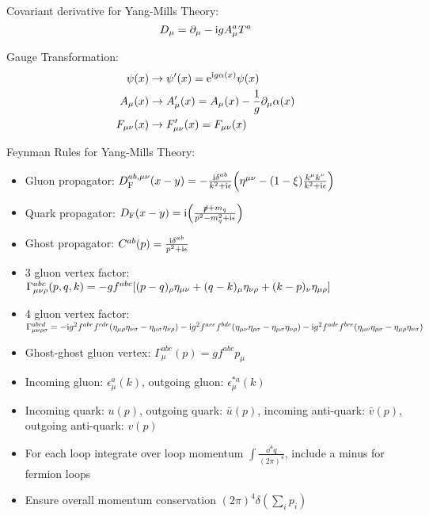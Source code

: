 		\noindent
		Covariant derivative for Yang-Mills Theory:
		\begin{equation}
			D_\mu = \partial_\mu - \mathrm{i} g A_\mu^a T^a
		\end{equation}

		\noindent
		Gauge Transformation:
		\begin{equation}
			\begin{aligned}
				\psi(x) &\rightarrow \psi'(x) = \mathrm{e}^{\mathrm{i} g \alpha(x)} \psi(x) \\
				A_\mu(x) &\rightarrow A'_\mu(x) = A_\mu(x) - \frac{1}{g} \partial_\mu \alpha(x) \\
				F_{\mu\nu}(x) &\rightarrow F'_{\mu\nu}(x) = F_{\mu\nu}(x) 
			\end{aligned}
		\end{equation}

		\noindent
		Feynman Rules for Yang-Mills Theory:
		\begin{itemize}\itemsep -0pt
			\item Gluon propagator: $D_\text{F}^{ab,\mu\nu}(x-y) = -\frac{\mathrm{i} \delta^{ab}}{k^2+\mathrm{i}\epsilon} \qty(\eta^{\mu\nu}-(1-\xi)\frac{k^\mu k^\nu}{k^2+\mathrm{i}\epsilon} )$
			\item Quark propagator: $D_\text{F}(x-y) = \mathrm{i}\qty(\frac{\slashed{p}+m_q}{p^2-m_q^2+\mathrm{i}\epsilon})$
			\item Ghost propagator: $C^{ab}(p) = \frac{\mathrm{i}\delta^{ab}}{p^2+\mathrm{i}\epsilon}$
			\item 3 gluon vertex factor: $\Gamma^{abc}_{\mu\nu\rho}(p,q,k) = -gf^{abc} \qty[(p-q)_\rho \eta_{\mu\nu} + (q-k)_\mu \eta_{\nu\rho} + (k-p)_\nu \eta_{\mu\rho}]$
			\item 4 gluon vertex factor: $\Gamma^{abcd}_{\mu\nu\rho\sigma} = -\mathrm{i} g^2 f^{abe}f^{cde}(\eta_{\mu\rho}\eta_{\nu\sigma} - \eta_{\mu\sigma}\eta_{\nu\rho}) - \mathrm{i} g^2 f^{ace}f^{bde} (\eta_{\mu\nu}\eta_{\rho\sigma} - \eta_{\mu\sigma}\eta_{\nu\rho}) - \mathrm{i} g^2 f^{ade} f^{bce} (\eta_{\mu\nu}\eta_{\rho\sigma} - \eta_{\mu\rho}\eta_{\nu\sigma})$
			\item Ghost-ghost gluon vertex: $\Gamma^{abc}_\mu(p) = gf^{abc} p_\mu$
			\item Incoming gluon: $\epsilon^a_\mu(k)$, outgoing gluon: $\epsilon^{*a}_\mu(k)$
			\item Incoming quark: $u(p)$, outgoing quark: $\bar{u}(p)$, incoming anti-quark: $\bar{v}(p)$, outgoing anti-quark: $v(p)$
			\item For each loop integrate over loop momentum $\int \frac{\dd^4 q}{(2\pi)^4}$, include a minus for fermion loops
			\item Ensure overall momentum conservation $(2\pi)^4 \delta(\sum_i p_i)$
		\end{itemize}
		
